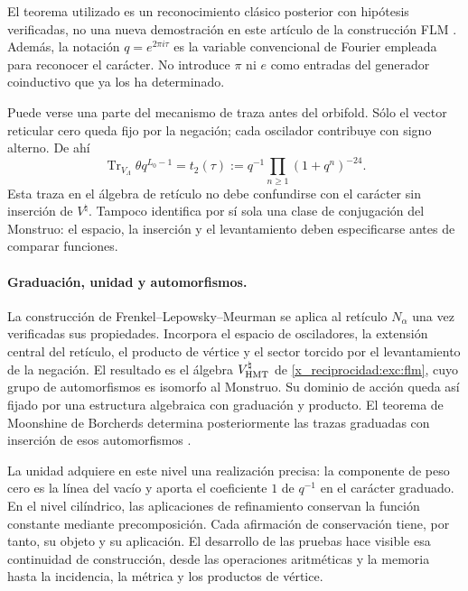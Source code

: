 El teorema utilizado es un reconocimiento clásico posterior con
hipótesis verificadas, no una nueva demostración en este artículo de
la construcción FLM \cite{x_reciprocidad:flm}.
Además, la notación $q=e^{2\pi i\tau}$ es la variable convencional
de Fourier empleada para reconocer el carácter. No introduce $\pi$
ni $e$ como entradas del generador coinductivo que ya los ha determinado.

Puede verse una parte del mecanismo de traza antes del orbifold.
Sólo el vector reticular cero queda fijo por la negación; cada
oscilador contribuye con signo alterno. De ahí
\[
 \operatorname{Tr}_{V_\Lambda}\theta q^{L_0-1}
   =t_2(\tau)
   :=q^{-1}\prod_{n\geq1}(1+q^n)^{-24}.
\]
Esta traza en el álgebra de retículo no debe confundirse con el
carácter sin inserción de $V^\natural$. Tampoco identifica por sí
sola una clase de conjugación del Monstruo: el espacio, la inserción
y el levantamiento deben especificarse antes de comparar funciones.


\paragraph{Graduación, unidad y automorfismos.}
\label{x_reciprocidad:inc-ampl-automorfismos}
La construcción de Frenkel--Lepowsky--Meurman se aplica al retículo
$N_\alpha$ una vez verificadas sus propiedades. Incorpora el espacio
de osciladores, la extensión central del retículo, el producto de vértice
y el sector torcido por el levantamiento de la negación. El resultado es
el álgebra $V^\natural_{\rm HMT}$ de \eqref{x_reciprocidad:exc:flm}, cuyo grupo
de automorfismos es isomorfo al Monstruo. Su dominio de acción queda así
fijado por una estructura algebraica con graduación y producto. El teorema
de Moonshine de Borcherds determina posteriormente las trazas graduadas
con inserción de esos automorfismos \cite{x_reciprocidad:flm,x_reciprocidad:borcherds}.

La unidad adquiere en este nivel una realización precisa: la componente
de peso cero es la línea del vacío y aporta el coeficiente $1$ de
$q^{-1}$ en el carácter graduado. En el nivel cilíndrico, las
aplicaciones de refinamiento conservan la función constante mediante
precomposición. Cada afirmación de conservación tiene, por tanto, su
objeto y su aplicación. El desarrollo de las pruebas hace visible esa
continuidad de construcción, desde las operaciones aritméticas y la
memoria hasta la incidencia, la métrica y los productos de vértice.

